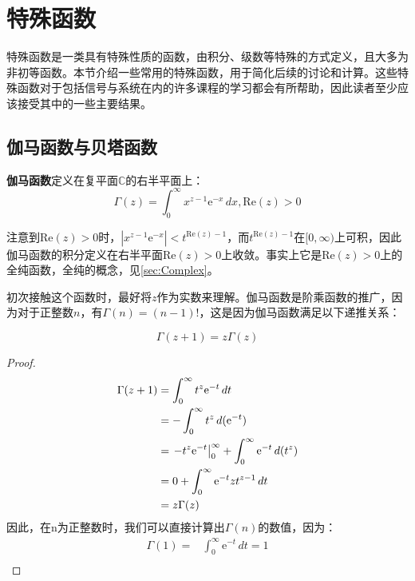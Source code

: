 \section{特殊函数}\label{sec:special_function}

特殊函数是一类具有特殊性质的函数，由积分、级数等特殊的方式定义，且大多为非初等函数。本节介绍一些常用的特殊函数，用于简化后续的讨论和计算。这些特殊函数对于包括信号与系统在内的许多课程的学习都会有所帮助，因此读者至少应该接受其中的一些主要结果。

\subsection{伽马函数与贝塔函数}\label{sub:Gamma}

\begin{definition}
    \textbf{伽马函数}定义在复平面$\mathbb{C}$的右半平面上：
    \[\Gamma (z)=\int_{0}^{\infty}x^{z-1}\mathrm{e}^{-x}\,dx,\text{Re}(z)>0\]
\end{definition}
注意到$\text{Re}(z)>0$时，$|x^{z-1}\mathrm{e}^{-x}|<t^{\text{Re}(z)-1}$，而$t^{\text{Re}(z)-1}$在$[0,\infty)$上可积，因此伽马函数的积分定义在右半平面$\text{Re}(z)>0$上收敛。事实上它是$\text{Re}(z)>0$上的全纯函数，全纯的概念，见\ref{sec:Complex}。

初次接触这个函数时，最好将$z$作为实数来理解。伽马函数是阶乘函数的推广，因为对于正整数$n$，有$\Gamma (n)=(n-1)!$，这是因为伽马函数满足以下递推关系：
\begin{theorem}
    \[\Gamma (z+1)=z\Gamma (z)\]
\end{theorem}
\begin{proof}
    \begin{align*}
    \Gamma (z+1)&=\int_{0}^{\infty}t^{z}\mathrm{e}^{-t}\,dt\\
                &=-\int_{0}^{\infty}t^{z}\,d(\mathrm{e}^{-t})\\
                &=\left.-t^{z}\mathrm{e}^{-t}\right|_{0}^{\infty}+\int_{0}^{\infty}\mathrm{e}^{-t}\,d(t^{z})\\
                &=0+\int_{0}^{\infty}\mathrm{e}^{-t}zt^{z-1}\,dt\\
                &=z\Gamma (z)
    \end{align*}
    因此，在n为正整数时，我们可以直接计算出$\Gamma(n)$的数值，因为：
    \begin{align*}
        \Gamma(1)=&\int_{0}^{\infty}\mathrm{e}^{-t}\,dt=1\\
    \end{align*}
\end{proof}

